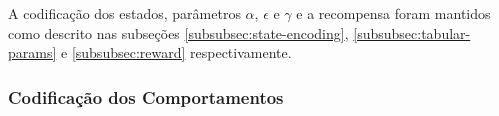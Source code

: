 A codificação dos estados, parâmetros $\alpha$, $\epsilon$ e $\gamma$ e a recompensa foram mantidos como descrito nas subseções \ref{subsubsec:state-encoding}, \ref{subsubsec:tabular-params} e \ref{subsubsec:reward} respectivamente.

\subsubsection{Codificação dos Comportamentos}

